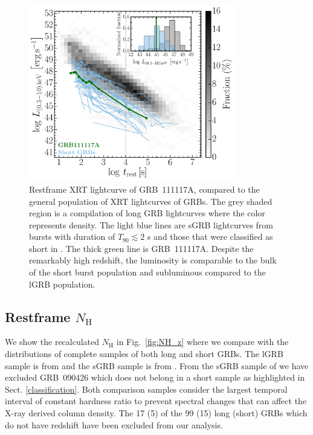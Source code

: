 \documentclass{aa}    %
\begin{document}
\begin{figure}
	\centering
	\includegraphics[width=9cm]{figures/XLC_111117A_rest.pdf}
	\caption{Restframe XRT lightcurve of GRB~111117A, compared to the general population of XRT lightcurves of GRBs. The grey shaded region is a compilation of long GRB lightcurves \citep{Evans2007, Evans2009} where the color represents density. The light blue lines are sGRB lightcurves from bursts with duration of $T_{90} \lesssim 2$ s and those that were classified as short in \citet{Kann2011, Berger2014, DAvanzo2014a}. The thick green line is GRB~111117A. Despite the remarkably high redshift, the luminosity is comparable to the bulk of the short burst population and subluminous compared to the lGRB population.}
	\label{fig:sxray_lightcurve}
\end{figure}

\subsection{Restframe $N_\mathrm{H}$} \label{restnH}

We show the recalculated $N_\mathrm{H}$ in Fig.~\ref{fig:NH_z} where we compare
with the distributions of complete samples of both long and short GRBs. The lGRB
sample is from \citet{Arcodia2016} and the sGRB sample is from
\citet{DAvanzo2014a}. From the sGRB sample of \citet{DAvanzo2014a} we have
excluded GRB~090426 which does not belong in a short sample as highlighted in
Sect. \ref{classification}. Both comparison samples consider the largest
temporal interval of constant hardness ratio to prevent spectral changes that
can affect the X-ray derived column density. The 17 (5) of the 99 (15) long
(short) GRBs which do not have redshift have been excluded from our analysis.
\end{document}
